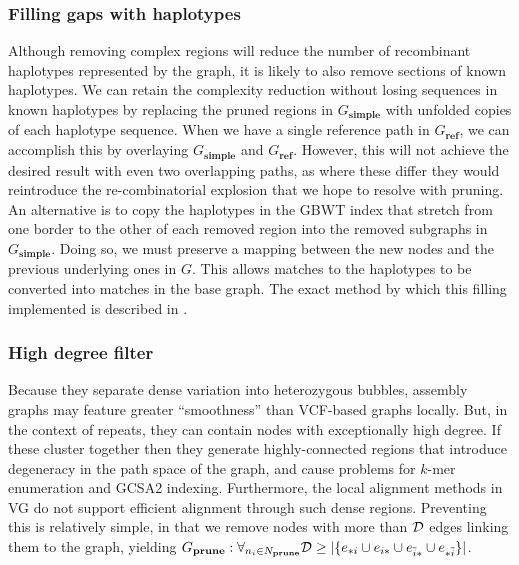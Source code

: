 \documentclass[a4paper,12pt,numbered,oneside]{Classes/PhDThesisPSnPDF}
\begin{document}
\subsubsection{Filling gaps with haplotypes}

Although removing complex regions will reduce the number of recombinant haplotypes represented by the graph, it is likely to also remove sections of known haplotypes.
We can retain the complexity reduction without losing sequences in known haplotypes by replacing the pruned regions in $G_\textbf{simple}$ with unfolded copies of each haplotype sequence.
When we have a single reference path in $G_\textbf{ref}$, we can accomplish this by overlaying $G_\textbf{simple}$ and $G_\textbf{ref}$.
However, this will not achieve the desired result with even two overlapping paths, as where these differ they would reintroduce the re-combinatorial explosion that we hope to resolve with pruning.
An alternative is to copy the haplotypes in the GBWT index that stretch from one border to the other of each removed region into the removed subgraphs in $G_\textbf{simple}$.
Doing so, we must preserve a mapping between the new nodes and the previous underlying ones in $G$.
This allows matches to the haplotypes to be converted into matches in the base graph.
The exact method by which this filling implemented is described in \cite{siren2018haplotype}.

\subsubsection{High degree filter}

Because they separate dense variation into heterozygous bubbles, assembly graphs may feature greater ``smoothness'' than VCF-based graphs locally.
But, in the context of repeats, they can contain nodes with exceptionally high degree.
If these cluster together then they generate highly-connected regions that introduce degeneracy in the path space of the graph, and cause problems for $k$-mer enumeration and GCSA2 indexing.
Furthermore, the local alignment methods in VG do not support efficient alignment through such dense regions.
Preventing this is relatively simple, in that we remove nodes with more than ${\cal D}$ edges linking them to the graph, yielding $G_\textbf{prune} : \forall_{n_i \in N_\textbf{prune}}{{\cal D} \geq |\{ e_{*i} \cup e_{i*} \cup e_{\overline{i}*} \cup e_{*\overline{i}} \}|}$.
\end{document}
